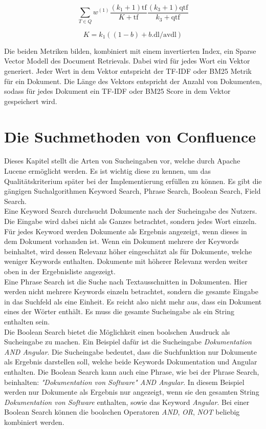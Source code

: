 \[\sum_{T \in Q}w^{(1)} \frac{(k_1 + 1)\text{tf}}{K + \text{tf}} \frac{(k_3 + 1)\text{qtf}}{k_3 + \text{qtf}}\]

\[K=k_1((1 - b) + b.\text{dl} / \text{avdl})\]

Die beiden Metriken bilden, kombiniert mit einem invertierten Index, ein Sparse Vector Modell des Document Retrievals.
Dabei wird für jedes Wort ein Vektor generiert.
Jeder Wert in dem Vektor entspricht der TF-IDF oder BM25 Metrik für ein Dokument.
Die Länge des Vektors entspricht der Anzahl von Dokumenten, sodass für jedes Dokument ein TF-IDF oder BM25 Score in dem Vektor gespeichert wird.

\section{Die Suchmethoden von Confluence}
\label{chap:suchmethoden-von-confluence}
Dieses Kapitel stellt die Arten von Sucheingaben vor, welche durch Apache Lucene ermöglicht werden.
Es ist wichtig diese zu kennen, um das Qualitätskriterium später bei der Implementierung erfüllen zu können.
Es gibt die gängigen Suchalgorithmen Keyword Search, Phrase Search, Boolean Search, Field Search.\\

Eine Keyword Search durchsucht Dokumente nach der Sucheingabe des Nutzers.
Die Eingabe wird dabei nicht als Ganzes betrachtet, sondern jedes Wort einzeln.
Für jedes Keyword werden Dokumente als Ergebnis angezeigt, wenn dieses in dem Dokument vorhanden ist.
Wenn ein Dokument mehrere der Keywords beinhaltet, wird dessen Relevanz höher eingeschätzt als für Dokumente, welche weniger Keywords enthalten.
Dokumente mit höherer Relevanz werden weiter oben in der Ergebnisliste angezeigt.\\

Eine Phrase Search ist die Suche nach Textausschnitten in Dokumenten.
Hier werden nicht mehrere Keywords einzeln betrachtet, sondern die gesamte Eingabe in das Suchfeld als eine Einheit.
Es reicht also nicht mehr aus, dass ein Dokument eines der Wörter enthält.
Es muss die gesamte Sucheingabe als ein String enthalten sein.\\

Die Boolean Search bietet die Möglichkeit einen boolschen Ausdruck als Sucheingabe zu machen.
Ein Beispiel dafür ist die Sucheingabe \textit{Dokumentation AND Angular}.
Die Sucheingabe bedeutet, dass die Suchfunktion nur Dokumente als Ergebnis darstellen soll, welche beide Keywords Dokumentation und Angular enthalten.
Die Boolean Search kann auch eine Phrase, wie bei der Phrase Search, beinhalten: \textit{"Dokumentation von Software" AND Angular}.
In diesem Beispiel werden nur Dokumente als Ergebnis nur angezeigt, wenn sie den gesamten String \textit{Dokumentation von Software} enthalten, sowie das Keyword \textit{Angular}.
Bei einer Boolean Search können die boolschen Operatoren \textit{AND}, \textit{OR}, \textit{NOT} beliebig kombiniert werden.\\


